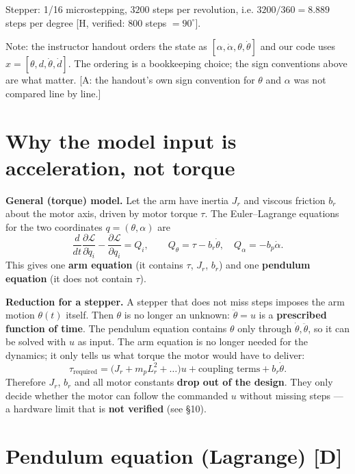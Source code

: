 \documentclass[11pt,a4paper]{article}
\begin{document}
Stepper: 1/16 microstepping, $3200$ steps per revolution, i.e. $3200/360=8.889$ steps per degree [H, verified: 800 steps $=90^\circ$].

Note: the instructor handout orders the state as $[\alpha,\dot\alpha,\theta,\dot\theta]$ and our code uses $x=[\theta,d,\dot\theta,\dot d]$. The ordering is a bookkeeping choice; the sign conventions above are what matter. [A: the handout's own sign convention for $\theta$ and $\alpha$ was not compared line by line.]


\section{Why the model input is acceleration, not torque}

\textbf{General (torque) model.} Let the arm have inertia $J_r$ and viscous friction $b_r$ about the motor axis, driven by motor torque $\tau$. The Euler–Lagrange equations for the two coordinates $q=(\theta,\alpha)$ are
\begin{equation*}
\frac{d}{dt}\frac{\partial \mathcal L}{\partial \dot q_i}-\frac{\partial \mathcal L}{\partial q_i}=Q_i,\qquad Q_\theta=\tau-b_r\dot\theta,\quad Q_\alpha=-b_p\dot\alpha .
\end{equation*}
This gives one \textbf{arm equation} (it contains $\tau$, $J_r$, $b_r$) and one \textbf{pendulum equation} (it does not contain $\tau$).

\textbf{Reduction for a stepper.} A stepper that does not miss steps imposes the arm motion $\theta(t)$ itself. Then $\theta$ is no longer an unknown: $\ddot\theta=u$ is a \textbf{prescribed function of time}. The pendulum equation contains $\theta$ only through $\dot\theta,\ddot\theta$, so it can be solved with $u$ as input. The arm equation is no longer needed for the dynamics; it only tells us what torque the motor would have to deliver:
\begin{equation*}
\tau_{\text{required}}=\bigl(J_r+m_pL_r^2+\dots\bigr)u+\text{coupling terms}+b_r\dot\theta .
\end{equation*}
Therefore $J_r$, $b_r$ and all motor constants \textbf{drop out of the design}. They only decide whether the motor can follow the commanded $u$ without missing steps — a hardware limit that is \textbf{not verified} (see §10).


\section{Pendulum equation (Lagrange) [D]}
\end{document}
